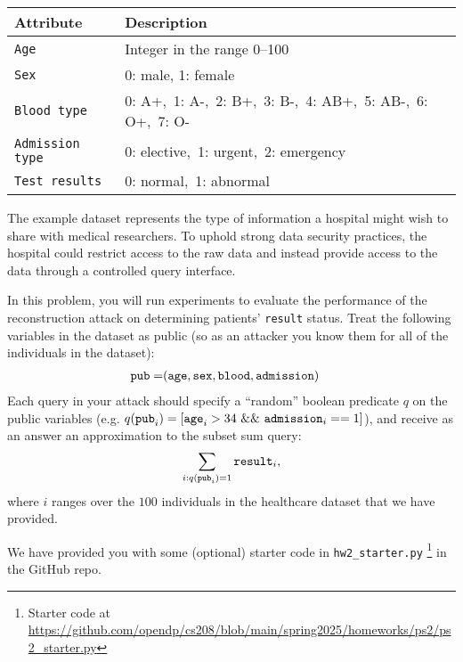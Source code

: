 \documentclass[11pt]{article}
\begin{document}
\begin{enumerate}[leftmargin=*]
\begin{center}
\begin{tabular}{@{}ll@{}}
\toprule
\textbf{Attribute} & \textbf{Description} \\ \midrule
\texttt{Age}       & Integer in the range 0--100 \\
\texttt{Sex}       & 0: male, 1: female \\
\texttt{Blood type}     & 0: A+,\, 1: A-,\, 2: B+,\, 3: B-,\, 4: AB+,\, 5: AB-,\, 6: O+,\, 7: O- \\
\texttt{Admission type} & 0: elective,\, 1: urgent,\, 2: emergency \\
\texttt{Test results}    & 0: normal,\, 1: abnormal \\
\bottomrule
\end{tabular}
\end{center}

The example dataset represents the type of information a hospital might wish to share with medical researchers. To uphold strong data security practices, the hospital could restrict access to the raw data and instead provide access to the data through a controlled query interface.



In this problem, you will run experiments to evaluate the performance of the reconstruction attack on determining patients' \texttt{result} status. Treat the following variables in the dataset as public (so as an attacker you know them for all of the individuals in the dataset): 
\begin{align}
\texttt{pub} =& (\texttt{age}, \texttt{sex}, \texttt{blood}, \texttt{admission})\nonumber
\end{align}
Each query in your attack should specify a ``random'' boolean predicate $q$ on the public variables (e.g. $q(\texttt{pub}_i) = [\texttt{age}_i > 34 ~\&\&~ \texttt{admission}_i == 1]$), and receive as an answer an approximation to the subset sum query:
\begin{equation}
\sum_{i : q(\texttt{pub}_i)=1} \texttt{result}_i,
\label{eqn:sumquery}
\end{equation}
where $i$ ranges over the $100$ individuals in the healthcare dataset that we have provided.

We have provided you with some (optional) starter code in \texttt{hw2\_starter.py}
\footnote{Starter code at \url{https://github.com/opendp/cs208/blob/main/spring2025/homeworks/ps2/ps2_starter.py}} in the GitHub repo. 


\end{enumerate}
\end{document}
